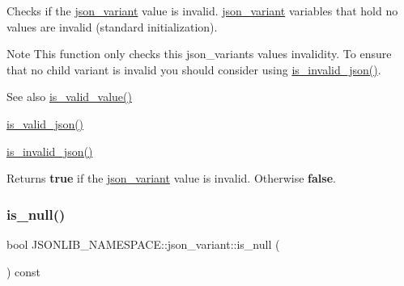 Checks if the \hyperlink{classJSONLIB__NAMESPACE_1_1json__variant}{json\+\_\+variant} value is invalid. \hyperlink{classJSONLIB__NAMESPACE_1_1json__variant}{json\+\_\+variant} variables that hold no values are invalid (standard initialization). 

\begin{DoxyNote}{Note}
This function only checks this json\+\_\+variants values invalidity. To ensure that no child variant is invalid you should consider using \hyperlink{classJSONLIB__NAMESPACE_1_1json__variant_a1a08b35da4cf3a334d32ebb81b20c08a}{is\+\_\+invalid\+\_\+json()}. 
\end{DoxyNote}
\begin{DoxySeeAlso}{See also}
\hyperlink{classJSONLIB__NAMESPACE_1_1json__variant_a224aab2dd56e3928dd893be8b7f3367a}{is\+\_\+valid\+\_\+value()} 

\hyperlink{classJSONLIB__NAMESPACE_1_1json__variant_a158e3148d9256af3d1b8251b2ca7b6c4}{is\+\_\+valid\+\_\+json()} 

\hyperlink{classJSONLIB__NAMESPACE_1_1json__variant_a1a08b35da4cf3a334d32ebb81b20c08a}{is\+\_\+invalid\+\_\+json()} 
\end{DoxySeeAlso}
\begin{DoxyReturn}{Returns}
{\bfseries true} if the \hyperlink{classJSONLIB__NAMESPACE_1_1json__variant}{json\+\_\+variant} value is invalid. Otherwise {\bfseries false}. 
\end{DoxyReturn}
\mbox{\label{classJSONLIB__NAMESPACE_1_1json__variant_abe8f66e81c598b6a9109a65e6844c5b5}} 
\subsubsection{\texorpdfstring{is\+\_\+null()}{is\_null()}}
{\footnotesize\ttfamily bool J\+S\+O\+N\+L\+I\+B\+\_\+\+N\+A\+M\+E\+S\+P\+A\+C\+E\+::json\+\_\+variant\+::is\+\_\+null (\begin{DoxyParamCaption}{ }\end{DoxyParamCaption}) const}



